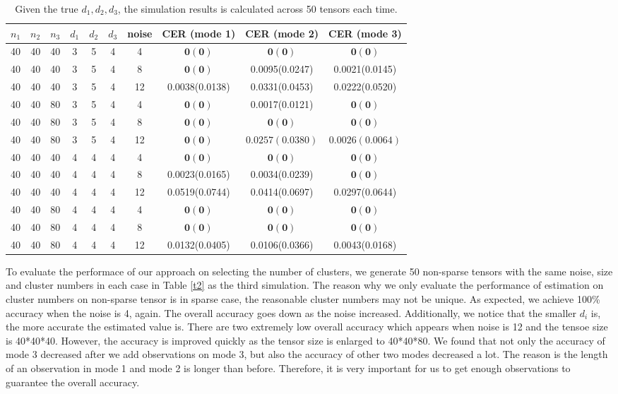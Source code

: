 \documentclass{article}
\begin{document}
\begin{table}
	\centering
	\begin{tabular}{|c|c|c|c|c|c|c|c|c|c|}
		\hline
		$n_1$&$n_2$&$n_3$&$d_1$&$d_2$&$d_3$&noise&CER (mode 1)&CER (mode 2)&CER (mode 3)\\ \hline
		40&40&40&3&5&4&4&
		$\mathbf{0(0)}$&$\mathbf{0(0)}$&$\mathbf{0(0)}$\\
		40&40&40&3&5&4&8&$\mathbf{0(0)}$&0.0095(0.0247)&0.0021(0.0145) \\
		40&40&40&3&5&4&12&0.0038(0.0138)&0.0331(0.0453)&0.0222(0.0520)\\

		40&40&80&3&5&4&4&$\mathbf{0(0)}$&0.0017(0.0121)&$\mathbf{0(0)}$\\
		40&40&80&3&5&4&8&$\mathbf{0(0)}$&$\mathbf{0(0)}$&$\mathbf{0(0)}$\\
		40&40&80&3&5&4&12&$\mathbf{0(0)}$&$0.0257(0.0380)$&$0.0026(0.0064)$\\

		40&40&40&4&4&4&4&$\mathbf{0(0)}$&$\mathbf{0(0)}$&$\mathbf{0(0)}$\\
		40&40&40&4&4&4&8&0.0023(0.0165)&0.0034(0.0239)&$\mathbf{0(0)}$\\
		40&40&40&4&4&4&12&0.0519(0.0744)&0.0414(0.0697)&0.0297(0.0644)\\
		
		40&40&80&4&4&4&4&$\mathbf{0(0)}$&$\mathbf{0(0)}$&$\mathbf{0(0)}$\\
		40&40&80&4&4&4&8&$\mathbf{0(0)}$&$\mathbf{0(0)}$&$\mathbf{0(0)}$\\
		40&40&80&4&4&4&12&0.0132(0.0405)&0.0106(0.0366)&0.0043(0.0168) \\
		\hline
	\end{tabular}
	\caption{Given the true $d_1,d_2,d_3$, the simulation results is calculated across 50 tensors each time. }
	\label{t1}
\end{table}


To evaluate the performace of our approach on selecting the number of clusters, we generate 50 non-sparse tensors with the same noise, size and cluster numbers in each case in Table \ref{t2} as the third simulation.  The reason why we only evaluate the performance of estimation on cluster numbers on non-sparse tensor is in sparse case, the reasonable cluster numbers may not be unique. As expected, we achieve 100\% accuracy when the noise is 4, again. The overall accuracy goes down as the noise increased. Additionally, we notice that the smaller $d_i$ is, the more accurate the estimated value is. There are two extremely low overall accuracy which appears when noise is 12 and the tensoe size is 40*40*40. However, the accuracy is improved quickly as the tensor size is enlarged to 40*40*80. We found that not only the accuracy of mode 3 decreased after we add observations on mode 3, but also the accuracy of other two modes decreased a lot. The reason is the length of an observation in mode 1 and mode 2 is longer than before. Therefore, it is very important for us to get enough observations to guarantee the overall accuracy.\par
\end{document}
